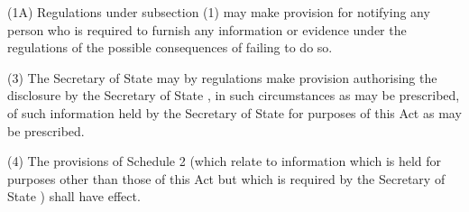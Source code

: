 \documentclass[12pt,a4paper]{article}
\begin{document}
(1A) Regulations under subsection (1) may make provision for notifying any person who is required to furnish any information or evidence under the regulations of the possible consequences of failing to do so.

%
%
%

(3) The Secretary of State may by regulations make provision authorising the disclosure by 
the 
Secretary of State%
, in such circumstances as may be prescribed, of such information held by 
the 
Secretary of State  %
for purposes of this Act as may be prescribed.

(4) The provisions of Schedule 2 (which relate to information which is held for purposes other than those of this Act but which is required by the 
Secretary of State%
) shall have effect.
\end{document}
